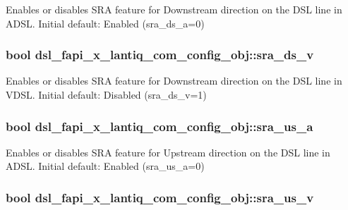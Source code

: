 Enables or disables S\-R\-A feature for Downstream direction on the D\-S\-L line in A\-D\-S\-L. Initial default\-: Enabled (sra\-\_\-ds\-\_\-a=0) \hypertarget{structdsl__fapi__x__lantiq__com__config__obj_aaa5b8cac570ec37513c336382c15a55a}{
\subsubsection[{sra\-\_\-ds\-\_\-v}]{\setlength{\rightskip}{0pt plus 5cm}bool dsl\-\_\-fapi\-\_\-x\-\_\-lantiq\-\_\-com\-\_\-config\-\_\-obj\-::sra\-\_\-ds\-\_\-v}}\label{structdsl__fapi__x__lantiq__com__config__obj_aaa5b8cac570ec37513c336382c15a55a}
Enables or disables S\-R\-A feature for Downstream direction on the D\-S\-L line in V\-D\-S\-L. Initial default\-: Disabled (sra\-\_\-ds\-\_\-v=1) \hypertarget{structdsl__fapi__x__lantiq__com__config__obj_ad3c82e31f489873e748481dc01c41c14}{
\subsubsection[{sra\-\_\-us\-\_\-a}]{\setlength{\rightskip}{0pt plus 5cm}bool dsl\-\_\-fapi\-\_\-x\-\_\-lantiq\-\_\-com\-\_\-config\-\_\-obj\-::sra\-\_\-us\-\_\-a}}\label{structdsl__fapi__x__lantiq__com__config__obj_ad3c82e31f489873e748481dc01c41c14}
Enables or disables S\-R\-A feature for Upstream direction on the D\-S\-L line in A\-D\-S\-L. Initial default\-: Enabled (sra\-\_\-us\-\_\-a=0) \hypertarget{structdsl__fapi__x__lantiq__com__config__obj_a1a825689261e4fdba5c9c53120885d03}{
\subsubsection[{sra\-\_\-us\-\_\-v}]{\setlength{\rightskip}{0pt plus 5cm}bool dsl\-\_\-fapi\-\_\-x\-\_\-lantiq\-\_\-com\-\_\-config\-\_\-obj\-::sra\-\_\-us\-\_\-v}}\label{structdsl__fapi__x__lantiq__com__config__obj_a1a825689261e4fdba5c9c53120885d03}
